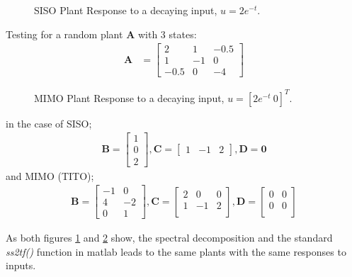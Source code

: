 \begin{figure}[t]
    \centering
    \scalebox{0.6}{
    \begin{tikzpicture}
    
    \end{tikzpicture}}
    \caption{SISO Plant Response to a decaying input, $u = 2e^{-t}$.}
    \label{siso}
\end{figure}
Testing for a random plant $\bm{A}$ with 3 states: 
\begin{align*}
\bm{A} &=
\begin{bmatrix}
2 & 1 & -0.5 \\
1 & -1 & 0 \\
-0.5 & 0 & -4 
\end{bmatrix}
\end{align*}
\begin{figure}[h]
    \centering
    \scalebox{0.7}{
    \begin{tikzpicture}
    
    \end{tikzpicture}}
    \caption{MIMO Plant Response to a decaying input, $u = [2e^{-t}\: 0]^T$. }
    \label{mimo}
\end{figure}


in the case of SISO;
\begin{align*}
\bm{B} = 
\begin{bmatrix}
1 \\
0 \\
2 
\end{bmatrix},
\bm{C} = 
 \begin{bmatrix}
1 & -1 & 2 
\end{bmatrix},
\bm{D} = \bm{0}
\end{align*}
and MIMO (TITO);
\begin{align*}
\bm{B} = 
\begin{bmatrix}
-1 & 0 \\
4 & -2 \\
0 & 1 
\end{bmatrix},
\bm{C} = 
 \begin{bmatrix}
2 & 0 & 0 \\
1 & -1 & 2 \\
\end{bmatrix},
\bm{D} = 
 \begin{bmatrix}
0 & 0 \\
0 & 0 \\
\end{bmatrix}
\end{align*}

As both figures \ref{siso} and \ref{mimo} show, the spectral decomposition and the standard \emph{ss2tf()} function in matlab leads to the same plants with the same responses to inputs.